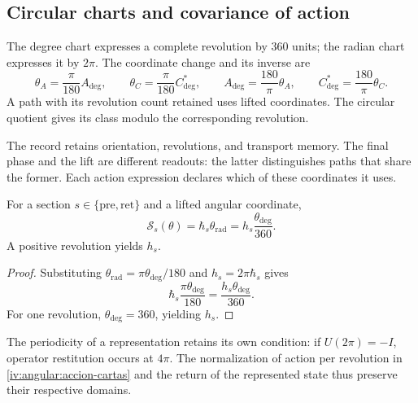 \subsection{Circular charts and covariance of action}
\label{iv:angular:cartas}

\begin{definition}
\label{iv:angular:unidades}
The degree chart expresses a complete revolution by \(360\)
units; the radian chart expresses it by \(2\pi\). The coordinate
change and its inverse are
\begin{equation}
 \theta_A=\frac{\pi}{180}A_{\deg},\qquad
 \theta_C=\frac{\pi}{180}C^*_{\deg},\qquad
 A_{\deg}=\frac{180}{\pi}\theta_A,\qquad
 C^*_{\deg}=\frac{180}{\pi}\theta_C.
 \label{iv:angular:cambio-carta}
\end{equation}
A path with its revolution count retained uses lifted
coordinates. The circular quotient gives its class modulo
the corresponding revolution.
\end{definition}

The record retains orientation, revolutions, and transport memory.
The final phase and the lift are different readouts: the latter
distinguishes paths that share the former. Each action expression
declares which of these coordinates it uses.

\begin{proposition}
\label{iv:angular:accion}
For a section \(s\in\{\mathrm{pre},\mathrm{ret}\}\) and a
lifted angular coordinate,
\begin{equation}
 \mathcal S_s(\theta)
 =\hbar_s\theta_{\mathrm{rad}}
 =h_s\frac{\theta_{\deg}}{360}.
 \label{iv:angular:accion-cartas}
\end{equation}
A positive revolution yields \(h_s\).
\end{proposition}
\begin{proof}
Substituting
\(\theta_{\mathrm{rad}}=\pi\theta_{\deg}/180\) and
\(h_s=2\pi\hbar_s\) gives
\[
 \hbar_s\frac{\pi\theta_{\deg}}{180}
 =\frac{h_s\theta_{\deg}}{360}.
\]
For one revolution, \(\theta_{\deg}=360\), yielding \(h_s\).
\end{proof}

The periodicity of a representation retains its own condition:
if \(U(2\pi)=-I\), operator restitution occurs at \(4\pi\).
The normalization of action per revolution in
\eqref{iv:angular:accion-cartas} and the return of the represented
state thus preserve their respective domains.

